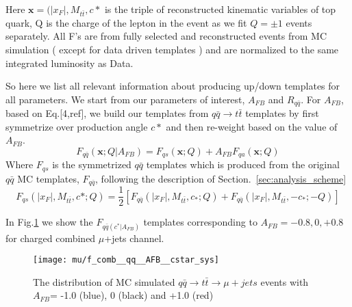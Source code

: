 \documentclass{cmspaperpdf}
\begin{document}
Here $\bm{x}=(|x_{F}|,M_{t\bar{t}},c*$ is the triple of reconstructed kinematic variables of top quark, Q is the charge of the lepton in the event as we fit $Q=\pm1$ events separately. All F's are from fully selected and reconstructed events from MC simulation ( except for data driven templates ) and are normalized to the same integrated luminosity as Data.

So here we list all relevant information about producing up/down templates for all parameters. We start from our parameters of interest, $A_{FB}$ and $R_{q\bar{q}}$. For $A_{FB}$, based on Eq.[4,ref], we build our templates from $q\bar{q}\rightarrow t\bar{t}$ templates by first symmetrize over production angle $c*$ and then re-weight based on the value of $A_{FB}$. 
\begin{equation}
\label{eq:Fqq_AFB}
F_{q\bar{q}}(\bm{x};Q|A_{FB}) = F_{qs}(\bm{x};Q)+ A_{FB} F_{qa}(\bm{x};Q)
\end{equation}
Where $F_{qs}$ is the symmetrized $q\bar{q}$ templates which is produced from the original $q\bar{q}$ MC templates, $F_{q\bar{q}}$, following the description of Section.~\ref{sec:analysis_scheme}
\begin{equation}
F_{qs}(|x_F|,M_{t\bar{t}},c*;Q) = \frac{1}{2}\left[ F_{q\bar{q}}(|x_F|,M_{t\bar{t}},c_*;Q)+F_{q\bar{q}}(|x_F|,M_{t\bar{t}},-c_*;-Q)\right]
\end{equation}

In Fig.\ref{fig:AFB_templates} we show the $F_{q\bar{q}(c^*|A_{FB})}$ templates corresponding to $A_{FB}=-0.8,0,+0.8$ for charged combined $\mu$+jets channel.

\begin{figure}[hbt]
  \begin{center}
    \texttt{[image: mu/f\_comb\_\_qq\_\_AFB\_\_cstar\_sys]}
  \caption{\small The distribution of MC simulated $q\bar{q}\rightarrow t\bar{t}\rightarrow \mu+jets$ events with $A_{FB}$= -1.0 (blue), 0 (black) and +1.0 (red)}
    \label{fig:AFB_templates}
  \end{center}
\end{figure}
\end{document}

